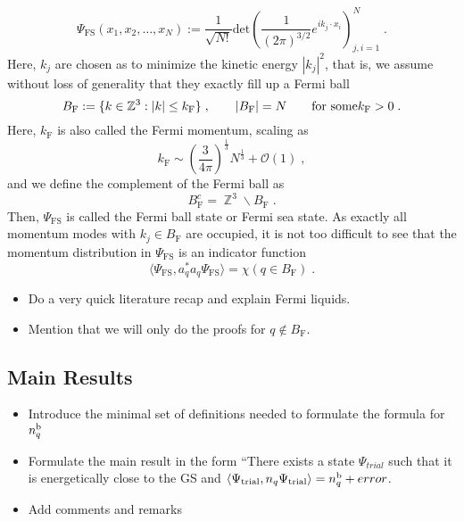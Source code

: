 \documentclass[12pt,a4paper]{article}
\numberwithin{equation}{section}
\newcommand{\ZZZ}{\mathbb{Z}}
\newcommand{\1}{\mathbb{I}}
\renewcommand{\b}{\textnormal{b}}
\newcommand{\F}{\mathrm{F}}
\newcommand{\FS}{\mathrm{FS}}
\DeclareMathOperator{\Z}{\mathbb{Z}}
\theoremstyle{plain}
\theoremstyle{definition}
\theoremstyle{remark}
\theoremstyle{plain}
\theoremstyle{definition}
\theoremstyle{remark}
\begin{document}
\begin{equation}
    \Psi_{\FS}(x_1, x_2, \ldots, x_N) := \frac{1}{\sqrt{N!}}\text{det}\left(\frac{1}{(2\pi)^{3/2}}e^{ik_j\cdot x_i}\right)^N_{j,i=1} \;.
\end{equation}
Here, $ k_j $ are chosen as to minimize the kinetic energy $ |k_j|^2 $, that is, we assume without loss of generality that they exactly fill up a Fermi ball
\begin{equation}
	B_{\F} := \{ k \in \ZZZ^3 : |k| \le k_{\F} \} \;, \qquad
	|B_{\F}| = N \qquad \textnormal{for some} k_{\F} > 0 \;.
\end{equation}
Here, $ k_{\F} $ is also called the Fermi momentum, scaling as
\begin{equation}
    k_{\F} \sim \left(\frac{3}{4\pi}\right)^\frac{1}{3}N^\frac{1}{3} + \mathcal{O}(1) \;,
\end{equation}
and we define the complement of the Fermi ball as 
\begin{equation}
    B_{\F}^c=\Z^3\backslash B_{\F} \;.
\end{equation}
Then, $ \Psi_{\FS} $ is called the Fermi ball state or Fermi sea state. As exactly all momentum modes with $ k_j \in B_{\F} $ are occupied, it is not too difficult to see that the momentum distribution in $ \Psi_{\FS} $ is an indicator function
\begin{equation}
	\langle \Psi_{\FS}, a_q^* a_q \Psi_{\FS} \rangle
	= \chi(q \in B_{\F}) \;.
\end{equation}


\begin{itemize}
\item Do a very quick literature recap and explain Fermi liquids.
\item Mention that we will only do the proofs for $ q \notin B_{\F} $.
\end{itemize}




\subsection{Main Results}
\label{subsec:mainresult}


\begin{itemize}
\item Introduce the minimal set of definitions needed to formulate the formula for $ n_q^{\b} $
\item Formulate the main result in the form ``There exists a state $ \Psi_{trial} $ such that it is energetically close to the GS and $ \langle \Psi_{\mathrm{trial}}, n_q \Psi_{\mathrm{trial}} \rangle = n_q^{\b} + error $.
\item Add comments and remarks
\end{itemize}
\end{document}
